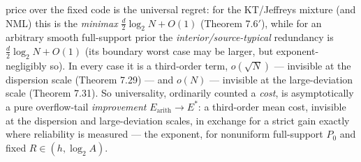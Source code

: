 \documentclass[
]{article}
\begin{document}
\begin{enumerate}
{price over the fixed code is the universal regret: for the KT/Jeffreys mixture (and
NML) this is the \emph{minimax} $\tfrac d2\log_2 N+O(1)$ (Theorem 7.6$'$), while for
an arbitrary smooth full-support prior the \emph{interior/source-typical} redundancy
is $\tfrac d2\log_2 N+O(1)$ (its boundary worst case may be larger, but
exponent-negligibly so). In every case it is a third-order term, $o(\sqrt N)$ ---
invisible at the dispersion scale (Theorem 7.29) --- and $o(N)$ --- invisible at the
large-deviation scale (Theorem 7.31). So universality, ordinarily counted a \emph{cost}, is asymptotically
a pure overflow-tail \emph{improvement} $E_{\mathrm{arith}}\to E^\ast$: a third-order
mean cost, invisible at the dispersion and large-deviation scales, in exchange for a
strict gain exactly where reliability is measured --- the exponent, for nonuniform
full-support $P_0$ and fixed $R\in(h,\log_2 A)$.}
\end{enumerate}
\end{document}

